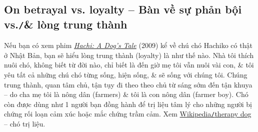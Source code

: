 \documentclass[12pt,oneside]{book}
\begin{document}
\subsection{On betrayal vs. loyalty -- Bàn về sự phản bội vs.{\tt/}\& lòng trung thành}
Nếu bạn có xem phim \href{https://www.imdb.com/title/tt1028532/}{\it Hachi: A Dog's Tale} (2009) kể về chú chó {\sc Hachiko} có thật ở Nhật Bản, bạn sẽ hiểu lòng trung thành (loyalty) là như thế nào. Nhà tôi thích nuôi chó, không biết từ đời nào, chỉ biết là đến giờ mẹ tôi vẫn nuôi vài con, \& tôi yêu tất cả những chú chó từng sống, hiện sống, \& sẽ sống với chúng tôi. Chúng trung thành, quan tâm chủ, tận tụy đi theo theo chủ từ sáng sớm đến tận khuya -- do cha mẹ tôi là nông dân (farmers) \& tôi là con nông dân (farmer boy). Chó còn được dùng như 1 người bạn đồng hành để trị liệu tâm lý cho những người bị chứng rối loạn cảm xúc hoặc mắc chứng trầm cảm. Xem \href{https://en.wikipedia.org/wiki/Therapy_dog}{Wikipedia{\tt/}therapy dog} -- chó trị liệu.
\end{document}
